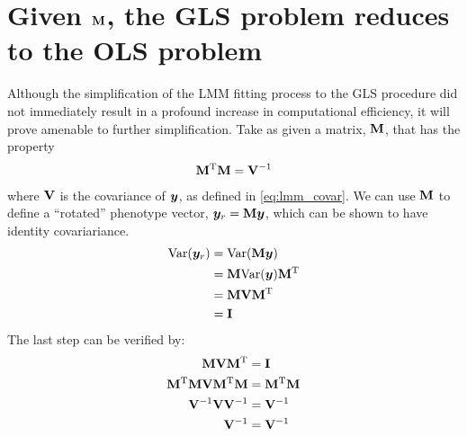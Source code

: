 


\section{Given \texorpdfstring{$\mathbf{M}$}{M}, the GLS problem reduces to the OLS problem}
\label{sec:givenM}

Although the simplification of the LMM fitting process to the GLS procedure did not immediately result in a profound increase in computational efficiency, it will prove amenable to further simplification.
Take as given a matrix, $\mathbf{M}$, that has the property
\begin{align}
	\mathbf{M} ^\mathrm{T} \mathbf{M} = \mathbf{V} ^{-1}
\end{align}
where $\mathbf{V}$ is the covariance of $\bm{y}$, as defined in \cref{eq:lmm_covar}.
We can use $\mathbf{M}$ to define a ``rotated'' phenotype vector, $\bm{y}_r = \mathbf{M} \bm{y}$, which can be shown to have identity covariariance.
\begin{align}
\text{Var}(\bm{y}_r) &= \text{Var}(\mathbf{M} \bm{y}) \\
            &= \mathbf{M} \text{Var}(\bm{y}) \mathbf{M} ^\mathrm{T}\\
            &= \mathbf{M} \mathbf{V} \mathbf{M} ^\mathrm{T} \\
            &= \mathbf{I}
\end{align}
The last step can be verified by:
\begin{align}
  \mathbf{M} \mathbf{V} \mathbf{M} ^\mathrm{T}            &= \mathbf{I}\\
  \mathbf{M} ^\mathrm{T} \mathbf{M} \mathbf{V} \mathbf{M} ^\mathrm{T} \mathbf{M} &= \mathbf{M} ^\mathrm{T} \mathbf{M} \\
  \mathbf{V} ^{-1} \mathbf{V} \mathbf{V} ^{-1}     &= \mathbf{V} ^{-1}\\
  \mathbf{V} ^{-1}                  &= \mathbf{V} ^{-1}
\end{align}

